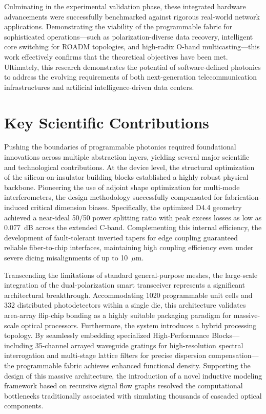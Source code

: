 Culminating in the experimental validation phase, these integrated hardware advancements were 
successfully benchmarked against rigorous real-world network applications. Demonstrating the 
viability of the programmable fabric for sophisticated operations—such as polarization-diverse 
data recovery, intelligent core switching for ROADM topologies, and high-radix O-band 
multicasting—this work effectively confirms that the theoretical objectives have been met. 
Ultimately, this research demonstrates the potential of software-defined photonics 
to address the evolving requirements of both next-generation telecommunication infrastructures and 
artificial intelligence-driven data centers.


\section{Key Scientific Contributions}
\label{sec:ch6_contributions}

Pushing the boundaries of programmable photonics required foundational innovations across multiple 
abstraction layers, yielding several major scientific and technological contributions.
At the device level, the structural optimization of the silicon-on-insulator building blocks 
established a highly robust physical backbone.
Pioneering the use of adjoint shape optimization for multi-mode interferometers, the design 
methodology successfully compensated for fabrication-induced critical dimension biases.
Specifically, the optimized D4.4 geometry achieved a near-ideal 50/50 power splitting ratio with 
peak excess losses as low as 0.077~dB across the extended C-band.
Complementing this internal efficiency, the development of fault-tolerant inverted tapers for edge 
coupling guaranteed reliable fiber-to-chip interfaces, maintaining high coupling efficiency even 
under severe dicing misalignments of up to 10~$\mu$m.

Transcending the limitations of standard general-purpose meshes, the large-scale integration of the 
dual-polarization smart transceiver represents a significant architectural breakthrough.
Accommodating 1020 programmable unit cells and 332 distributed photodetectors within a single die, 
this architecture validates area-array flip-chip bonding as a highly suitable packaging paradigm 
for massive-scale optical processors. Furthermore, the system introduces a hybrid processing 
topology.
By seamlessly embedding specialized High-Performance Blocks—including 35-channel arrayed waveguide 
gratings for high-resolution spectral interrogation and multi-stage lattice filters for precise 
dispersion compensation—the programmable fabric achieves enhanced functional density.
Supporting the design of this massive architecture, the introduction of a novel inductive modeling 
framework based on recursive signal flow graphs resolved the computational bottlenecks 
traditionally associated with simulating thousands of cascaded optical components.

